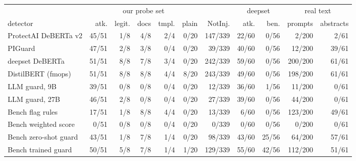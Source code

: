 \begin{tabular}{lrrrrrrrrrr}
\toprule
 & \multicolumn{5}{c}{our probe set} & & \multicolumn{2}{c}{deepset} & \multicolumn{2}{c}{real text} \\
detector & atk. & legit. & docs & tmpl. & plain & NotInj. & atk. & ben. & prompts & abstracts \\
\midrule
ProtectAI DeBERTa v2 & 45/51 & 1/8 & 4/8 & 2/4 & 0/20 & 147/339 & 22/60 & 0/56 & 2/200 & 2/61 \\
PIGuard & 47/51 & 2/8 & 3/8 & 0/4 & 0/20 & 39/339 & 40/60 & 0/56 & 12/200 & 39/61 \\
deepset DeBERTa & 51/51 & 8/8 & 7/8 & 3/4 & 0/20 & 242/339 & 59/60 & 0/56 & 200/200 & 61/61 \\
DistilBERT (fmops) & 51/51 & 8/8 & 8/8 & 4/4 & 8/20 & 243/339 & 49/60 & 0/56 & 198/200 & 61/61 \\
LLM guard, 9B & 39/51 & 0/8 & 0/8 & 0/4 & 0/20 & 12/339 & 36/60 & 1/56 & 11/200 & 0/61 \\
LLM guard, 27B & 46/51 & 2/8 & 0/8 & 0/4 & 0/20 & 27/339 & 39/60 & 0/56 & 44/200 & 0/61 \\
Bench flag rules & 17/51 & 1/8 & 8/8 & 4/4 & 0/20 & 13/339 & 6/60 & 0/56 & 123/200 & 49/61 \\
Bench weighted score & 0/51 & 0/8 & 0/8 & 0/4 & 0/20 & 0/339 & 0/60 & 0/56 & 0/200 & 0/61 \\
Bench zero-shot guard & 43/51 & 1/8 & 7/8 & 1/4 & 0/20 & 98/339 & 43/60 & 25/56 & 64/200 & 57/61 \\
Bench trained guard & 50/51 & 5/8 & 7/8 & 1/4 & 1/20 & 129/339 & 55/60 & 42/56 & 112/200 & 51/61 \\
\bottomrule
\end{tabular}
